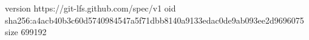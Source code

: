 version https://git-lfs.github.com/spec/v1
oid sha256:a4acb40b3c60d5740984547a5f71dbb8140a9133edac0de9ab093ee2d9696075
size 699192
